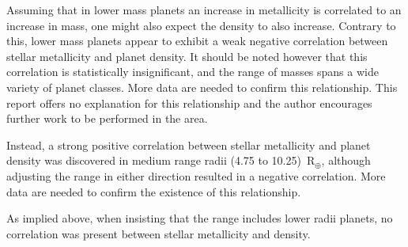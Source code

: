 \documentclass[a4paper,twocolumn,12pt]{article}
\begin{document}




Assuming that in lower mass planets an increase in metallicity is correlated to an increase in mass, one might also expect the density to also increase. Contrary to this, lower mass planets appear to exhibit a weak negative correlation between stellar metallicity and planet density. It should be noted however that this correlation is statistically insignificant, and the range of masses spans a wide variety of planet classes. More data are needed to confirm this relationship. This report offers no explanation for this relationship and the author encourages further work to be performed in the area.

Instead, a strong positive correlation between stellar metallicity and planet density was discovered in medium range radii (4.75 to 10.25)~R$_\oplus$, although adjusting the range in either direction resulted in a negative correlation. More data are needed to confirm the existence of this relationship.

As implied above, when insisting that the range includes lower radii planets, no correlation was present between stellar metallicity and density.\\
% 
% 
% 
% 

% 
% 
% 
\end{document}
